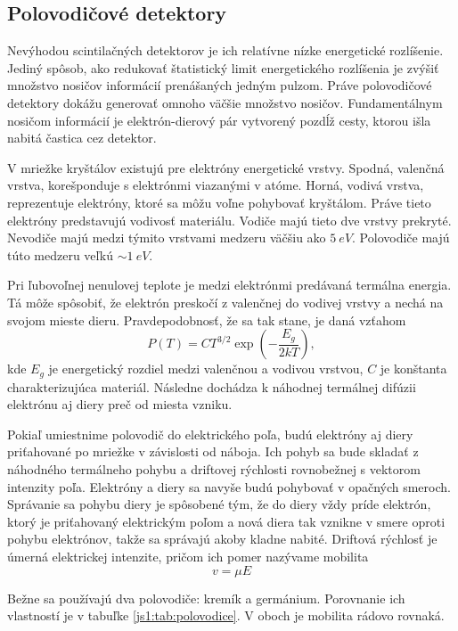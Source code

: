 \documentclass[../../main.tex]{subfiles}
\begin{document}
\subsection{Polovodičové detektory}

Nevýhodou scintilačných detektorov je ich relatívne nízke energetické rozlíšenie. Jediný spôsob, ako redukovať štatistický limit energetického rozlíšenia je zvýšiť množstvo nosičov informácií prenášaných jedným pulzom. Práve polovodičové detektory dokážu generovať omnoho väčšie množstvo nosičov. Fundamentálnym nosičom informácií je elektrón-dierový pár vytvorený pozdĺž cesty, ktorou išla nabitá častica cez detektor. 

V mriežke kryštálov existujú pre elektróny energetické vrstvy. Spodná, valenčná vrstva, korešponduje s elektrónmi viazanými v atóme. Horná, vodivá vrstva, reprezentuje elektróny, ktoré sa môžu voľne pohybovať kryštálom. Práve tieto elektróny predstavujú vodivosť materiálu. Vodiče majú tieto dve vrstvy prekryté. Nevodiče majú medzi týmito vrstvami medzeru väčšiu ako $5\:\unit{eV}$. Polovodiče majú túto medzeru veľkú $\sim 1\:\unit{eV}$.

Pri ľubovoľnej nenulovej teplote je medzi elektrónmi predávaná termálna energia. Tá môže spôsobiť, že elektrón preskočí z valenčnej do vodivej vrstvy a nechá na svojom mieste dieru. Pravdepodobnosť, že sa tak stane, je daná vzťahom
\begin{equation}
P(T)=CT^{3/2}\exp\left(-\dfrac{E_g}{2kT}\right),
\end{equation}
kde $E_g$ je energetický rozdiel medzi valenčnou a vodivou vrstvou, $C$ je konštanta charakterizujúca materiál. Následne dochádza k náhodnej termálnej difúzii elektrónu aj diery preč od miesta vzniku. 

Pokiaľ umiestnime polovodič do elektrického poľa, budú elektróny aj diery priťahované po mriežke v závislosti od náboja. Ich pohyb sa bude skladať z náhodného termálneho pohybu a driftovej rýchlosti rovnobežnej s vektorom intenzity poľa. Elektróny a diery sa navyše budú pohybovať v opačných smeroch. Správanie sa pohybu diery je spôsobené tým, že do diery vždy príde elektrón, ktorý je priťahovaný elektrickým poľom a nová diera tak vznikne v smere oproti pohybu elektrónov, takže sa správajú akoby kladne nabité. Driftová rýchlosť je úmerná elektrickej intenzite, pričom ich pomer nazývame mobilita
\begin{equation}
v=\mu E
\end{equation}

Bežne sa používajú dva polovodiče: kremík a germánium. Porovnanie ich vlastností je v tabuľke \ref{js1:tab:polovodice}. V oboch je mobilita rádovo rovnaká.
\end{document}
